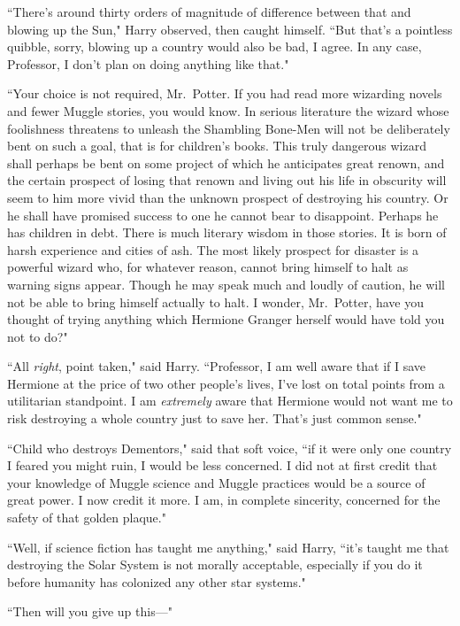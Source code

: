 ``There's around thirty orders of magnitude of difference between that and blowing up the Sun," Harry observed, then caught himself. ``But that's a pointless quibble, sorry, blowing up a country would also be bad, I agree. In any case, Professor, I don't plan on doing anything like that."

``Your choice is not required, Mr.~Potter. If you had read more wizarding novels and fewer Muggle stories, you would know. In serious literature the wizard whose foolishness threatens to unleash the Shambling Bone-Men will not be deliberately bent on such a goal, that is for children's books. This truly dangerous wizard shall perhaps be bent on some project of which he anticipates great renown, and the certain prospect of losing that renown and living out his life in obscurity will seem to him more vivid than the unknown prospect of destroying his country. Or he shall have promised success to one he cannot bear to disappoint. Perhaps he has children in debt. There is much literary wisdom in those stories. It is born of harsh experience and cities of ash. The most likely prospect for disaster is a powerful wizard who, for whatever reason, cannot bring himself to halt as warning signs appear. Though he may speak much and loudly of caution, he will not be able to bring himself actually to halt. I wonder, Mr.~Potter, have you thought of trying anything which Hermione Granger herself would have told you not to do?"

``All \emph{right}, point taken," said Harry. ``Professor, I am well aware that if I save Hermione at the price of two other people's lives, I've lost on total points from a utilitarian standpoint. I am \emph{extremely} aware that Hermione would not want me to risk destroying a whole country just to save her. That's just common sense."

``Child who destroys Dementors," said that soft voice, ``if it were only one country I feared you might ruin, I would be less concerned. I did not at first credit that your knowledge of Muggle science and Muggle practices would be a source of great power. I now credit it more. I am, in complete sincerity, concerned for the safety of that golden plaque."

``Well, if science fiction has taught me anything," said Harry, ``it's taught me that destroying the Solar System is not morally acceptable, especially if you do it before humanity has colonized any other star systems."

``Then will you give up this---"

